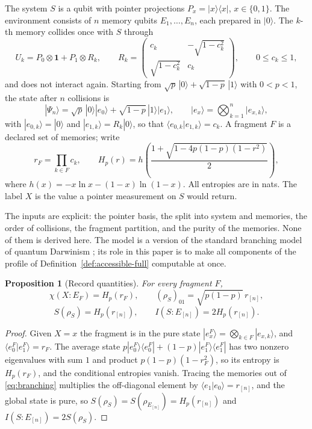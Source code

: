 \documentclass[12pt,a4paper]{article}
\newtheorem{proposition}[theorem]{Proposition}
\begin{document}
The system $S$ is a qubit with pointer projections $P_x=|x\rangle\langle x|$, $x\in\{0,1\}$. The environment consists of $n$ memory qubits $E_1,\dots,E_n$, each prepared in $|0\rangle$. The $k$-th memory collides once with $S$ through
\begin{equation}
U_k=P_0\otimes\mathbf 1+P_1\otimes R_k,\qquad
R_k=\begin{pmatrix}c_k&-\sqrt{1-c_k^2}\\ \sqrt{1-c_k^2}&c_k\end{pmatrix},\qquad 0\le c_k\le1,
\label{eq:collision}
\end{equation}
and does not interact again. Starting from $\sqrt p\,|0\rangle+\sqrt{1-p}\,|1\rangle$ with $0<p<1$, the state after $n$ collisions is
\begin{equation}
|\Psi_n\rangle=\sqrt p\,|0\rangle|e_0\rangle+\sqrt{1-p}\,|1\rangle|e_1\rangle,\qquad
|e_x\rangle=\bigotimes_{k=1}^n|e_{x,k}\rangle,
\label{eq:branching}
\end{equation}
with $|e_{0,k}\rangle=|0\rangle$ and $|e_{1,k}\rangle=R_k|0\rangle$, so that $\langle e_{0,k}|e_{1,k}\rangle=c_k$. A fragment $F$ is a declared set of memories; write
\[
r_F=\prod_{k\in F}c_k,\qquad
H_p(r)=h\!\left(\frac{1+\sqrt{1-4p(1-p)(1-r^2)}}2\right),
\]
where $h(x)=-x\ln x-(1-x)\ln(1-x)$. All entropies are in nats. The label $X$ is the value a pointer measurement on $S$ would return.

The inputs are explicit: the pointer basis, the split into system and memories, the order of collisions, the fragment partition, and the purity of the memories. None of them is derived here. The model is a version of the standard branching model of quantum Darwinism \cite{Zurek2009,ZwolakRiedelZurek2016}; its role in this paper is to make all components of the profile of Definition~\ref{def:accessible-full} computable at once.

\begin{proposition}[Record quantities]
\label{prop:records}
For every fragment $F$,
\[
\chi(X:E_F)=H_p(r_F),\qquad
(\rho_S)_{01}=\sqrt{p(1-p)}\,r_{[n]},
\]
\[
S(\rho_S)=H_p(r_{[n]}),\qquad I(S:E_{[n]})=2H_p(r_{[n]}).
\]
\end{proposition}

\begin{proof}
Given $X=x$ the fragment is in the pure state $|e_x^F\rangle=\bigotimes_{k\in F}|e_{x,k}\rangle$, and $\langle e_0^F|e_1^F\rangle=r_F$. The average state $p|e_0^F\rangle\langle e_0^F|+(1-p)|e_1^F\rangle\langle e_1^F|$ has two nonzero eigenvalues with sum $1$ and product $p(1-p)(1-r_F^2)$, so its entropy is $H_p(r_F)$, and the conditional entropies vanish. Tracing the memories out of \eqref{eq:branching} multiplies the off-diagonal element by $\langle e_1|e_0\rangle=r_{[n]}$, and the global state is pure, so $S(\rho_S)=S(\rho_{E_{[n]}})=H_p(r_{[n]})$ and $I(S:E_{[n]})=2S(\rho_S)$.
\end{proof}
\end{document}
